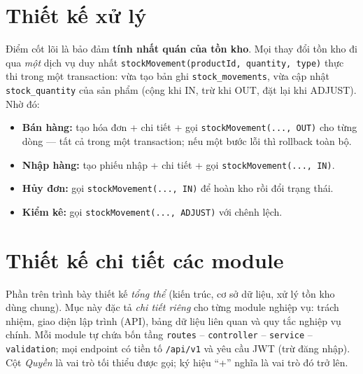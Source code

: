 \documentclass[12pt,a4paper]{report}
\begin{document}
\section{Thiết kế xử lý}
Điểm cốt lõi là bảo đảm \textbf{tính nhất quán của tồn kho}. Mọi thay đổi tồn kho đi qua \emph{một} dịch vụ duy nhất \texttt{stockMovement(productId, quantity, type)} thực thi trong một transaction: vừa tạo bản ghi \texttt{stock\_movements}, vừa cập nhật \texttt{stock\_quantity} của sản phẩm (cộng khi IN, trừ khi OUT, đặt lại khi ADJUST). Nhờ đó:
\begin{itemize}[leftmargin=1.4cm,nosep]
  \item \textbf{Bán hàng:} tạo hóa đơn + chi tiết + gọi \texttt{stockMovement(..., OUT)} cho từng dòng --- tất cả trong một transaction; nếu một bước lỗi thì rollback toàn bộ.
  \item \textbf{Nhập hàng:} tạo phiếu nhập + chi tiết + gọi \texttt{stockMovement(..., IN)}.
  \item \textbf{Hủy đơn:} gọi \texttt{stockMovement(..., IN)} để hoàn kho rồi đổi trạng thái.
  \item \textbf{Kiểm kê:} gọi \texttt{stockMovement(..., ADJUST)} với chênh lệch.
\end{itemize}

\section{Thiết kế chi tiết các module}
Phần trên trình bày thiết kế \emph{tổng thể} (kiến trúc, cơ sở dữ liệu, xử lý tồn kho dùng chung). Mục này đặc tả \emph{chi tiết riêng} cho từng module nghiệp vụ: trách nhiệm, giao diện lập trình (API), bảng dữ liệu liên quan và quy tắc nghiệp vụ chính. Mỗi module tự chứa bốn tầng \texttt{routes} -- \texttt{controller} -- \texttt{service} -- \texttt{validation}; mọi endpoint có tiền tố \texttt{/api/v1} và yêu cầu JWT (trừ đăng nhập). Cột \emph{Quyền} là vai trò tối thiểu được gọi; ký hiệu ``+'' nghĩa là vai trò đó trở lên.
\end{document}
